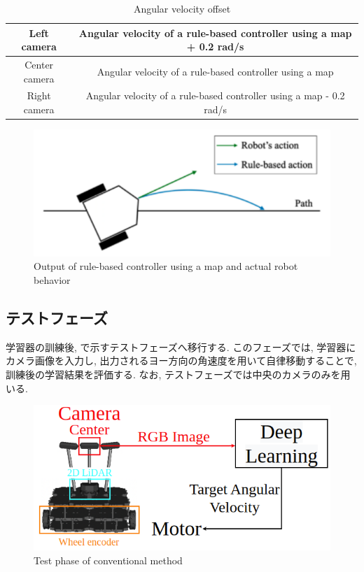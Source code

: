 \begin{table}[hbtp]
  \caption{Angular velocity offset}
  \label{table:angular}
  \centering
  \begin{tabular}{|c|c|}
    \hline
    Left camera  & Angular velocity of a rule-based controller using a map + 0.2 rad/s\\
    \hline
    Center camera  & Angular velocity of a rule-based controller using a map  \\
    \hline
    Right camera  & Angular velocity of a rule-based controller using a map - 0.2 rad/s   \\
    \hline
  \end{tabular}
\end{table}

\begin{figure}[hbtp]
  \centering
 \includegraphics[keepaspectratio, scale=0.4]
      {images/dakou.png}
 \caption{Output of rule-based controller using a map and actual robot behavior}
 \label{Fig:dakou}
\end{figure}

\subsection{テストフェーズ}
学習器の訓練後, で示すテストフェーズへ移行する. このフェーズでは, 学習器にカメラ画像を入力し, 出力されるヨー方向の角速度を用いて自律移動することで, 訓練後の学習結果を評価する. なお, テストフェーズでは中央のカメラのみを用いる.

\begin{figure}[hbtp]
  \centering
 \includegraphics[keepaspectratio, scale=0.6]
      {images/test_phase.png}
 \caption{Test phase of conventional method}
 \label{Fig:test_phase}
\end{figure}


\newpage